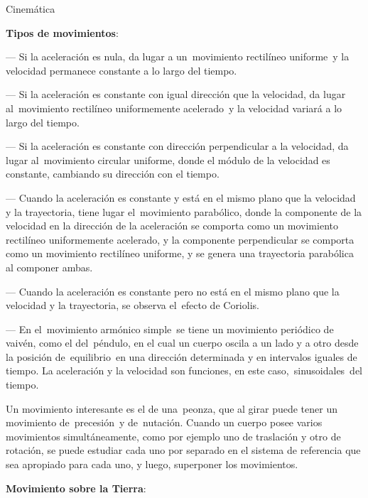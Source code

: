 \begin{myblock}{Cinemática}
\begin{small}
\vspace{2mm} \textbf{Tipos de movimientos}:

--- Si la aceleración es nula, da lugar a un movimiento rectilíneo uniforme y la velocidad permanece constante a lo largo del tiempo.

--- Si la aceleración es constante con igual dirección que la velocidad, da lugar al movimiento rectilíneo uniformemente acelerado y la velocidad variará a lo largo del tiempo.

--- Si la aceleración es constante con dirección perpendicular a la velocidad, da lugar al movimiento circular uniforme, donde el módulo de la velocidad es constante, cambiando su dirección con el tiempo.

--- Cuando la aceleración es constante y está en el mismo plano que la velocidad y la trayectoria, tiene lugar el movimiento parabólico, donde la componente de la velocidad en la dirección de la aceleración se comporta como un movimiento rectilíneo uniformemente acelerado, y la componente perpendicular se comporta como un movimiento rectilíneo uniforme, y se genera una trayectoria parabólica al componer ambas.

--- Cuando la aceleración es constante pero no está en el mismo plano que la velocidad y la trayectoria, se observa el efecto de Coriolis.

--- En el movimiento armónico simple se tiene un movimiento periódico de vaivén, como el del péndulo, en el cual un cuerpo oscila a un lado y a otro desde la posición de equilibrio en una dirección determinada y en intervalos iguales de tiempo. La aceleración y la velocidad son funciones, en este caso, sinusoidales del tiempo.


\vspace{2mm} Un movimiento interesante es el de una peonza, que al girar puede tener un movimiento de precesión y de nutación. Cuando un cuerpo posee varios movimientos simultáneamente, como por ejemplo uno de traslación y otro de rotación, se puede estudiar cada uno por separado en el sistema de referencia que sea apropiado para cada uno, y luego, superponer los movimientos.

\vspace{2mm} \textbf{Movimiento sobre la Tierra}:


\end{small}
\end{myblock}
